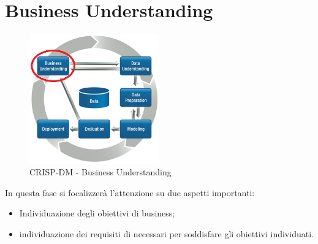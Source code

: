 \chapter{Business Understanding}
\begin{figure}[hbtp]
	\centering
	\includegraphics[width=0.5\textwidth]{./images/CRISPDM_1.png}
	\caption{CRISP-DM - Business Understanding}
	\label{CRISPDM_1}
\end{figure}
In questa fase si focalizzerà l'attenzione su due aspetti importanti:
\begin{itemize}
	\item Individuazione degli obiettivi di business;
	\item individuazione dei requisiti di necessari per soddisfare gli obiettivi individuati.
\end{itemize}
